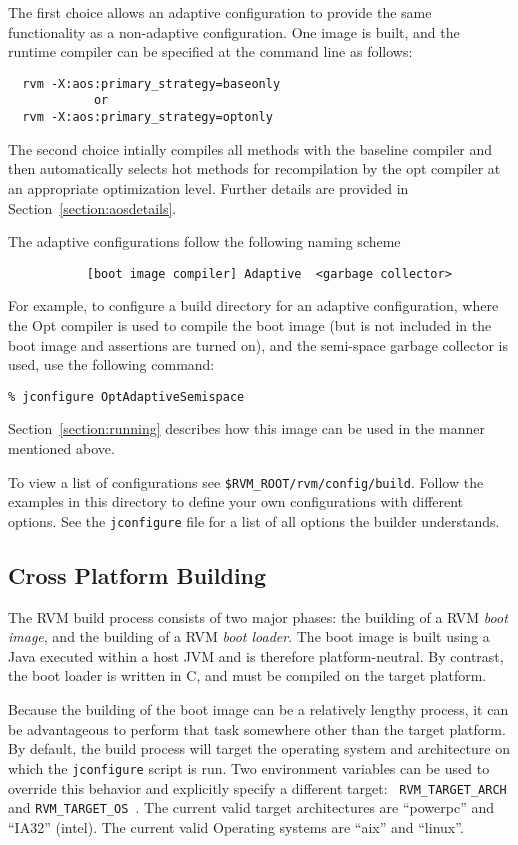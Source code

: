The first choice allows an adaptive configuration to provide the same
functionality as a non-adaptive configuration.  One image is built,
and the runtime compiler can be specified at the command line as
follows:
\begin{verbatim}
  rvm -X:aos:primary_strategy=baseonly
            or
  rvm -X:aos:primary_strategy=optonly
\end{verbatim}

The second choice intially compiles all methods with the
baseline compiler and then automatically selects hot methods for
recompilation by the opt compiler at an appropriate optimization
level. Further details are provided in Section~\ref{section:aosdetails}.

The adaptive configurations follow the following naming scheme
\begin{verbatim}
           [boot image compiler] Adaptive  <garbage collector>
\end{verbatim}

For example, to configure a build 
directory for an adaptive configuration, where the Opt compiler is 
used to compile the boot image (but is not included in the boot image
and assertions are turned on), and the semi-space garbage collector is
used, use the following command:

\begin{verbatim}
% jconfigure OptAdaptiveSemispace
\end{verbatim}

Section~\ref{section:running} describes how this image can be used in
the manner mentioned above.

To view a list of configurations see 
{\tt \$RVM\_ROOT/rvm/config/build}.  Follow the examples in this
directory to define your own configurations with different options.  See
the {\tt jconfigure} file for a list of all options the builder
understands.

\subsection{Cross Platform Building}

The RVM build process consists of two major phases: the building of a
RVM {\em boot image}, and the building of a RVM {\em boot loader}.
The boot image is built using a Java executed within a host
JVM and is therefore platform-neutral.  By contrast, the boot loader
is written in C, and must be compiled on the target platform.

Because the building of the boot image can be a relatively lengthy
process, it can be advantageous to perform that task somewhere other
than the target platform.  By default, the build process will target
the operating system and architecture on which the {\tt jconfigure}
script is run.  
    Two environment variables can be used to
override this behavior and explicitly specify a different target: {\tt
  RVM\_TARGET\_ARCH } and {\tt RVM\_TARGET\_OS }. The current valid target
architectures are ``powerpc'' and ``IA32'' (intel). The current valid
Operating systems are ``aix'' and ``linux''.

